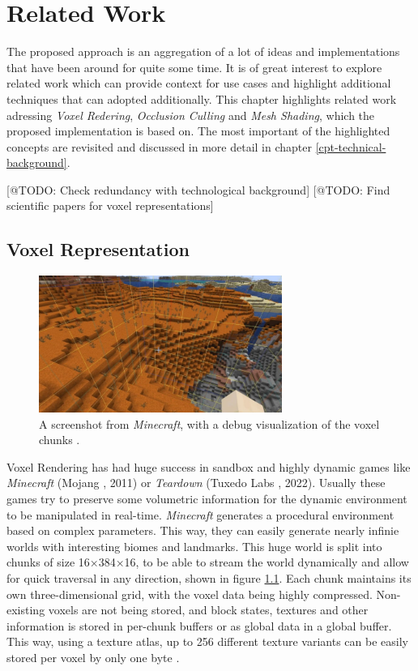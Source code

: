 \chapter{Related Work} \label{cpt-related-work}

The proposed approach is an aggregation of a lot of ideas and implementations that have been 
around for quite some time. It is of great interest to explore related work which can provide 
context for use cases and highlight additional techniques that can adopted additionally. This 
chapter highlights related work adressing \emph{Voxel Redering}, \emph{Occlusion Culling} 
and \emph{Mesh Shading}, which the proposed implementation is based on. The most important of 
the highlighted concepts are revisited and discussed in more detail in chapter 
\ref{cpt-technical-background}. 

[@TODO: Check redundancy with technological background]
[@TODO: Find scientific papers for voxel representations]

\section{Voxel Representation} \label{sec-voxel-representation}

\begin{figure}[h]
    \centering
    \includegraphics[width=300px]{images/graphics/minecraft-chunks.jpg}
    \caption{A screenshot from \emph{Minecraft}, with a debug visualization of the voxel chunks \cite{Palm2022}.}
    \label{fig:minecraft-chunks}
\end{figure}

\noindent
Voxel Rendering has had huge success in sandbox and highly dynamic games like \emph{Minecraft} (Mojang 
\cite{Mojang2024}, 2011) or \emph{Teardown} (Tuxedo Labs \cite{TuxedoLabs2022}, 2022). Usually these games try 
to preserve some volumetric information for the dynamic environment to be manipulated in real-time. \emph{Minecraft} 
generates a procedural environment based on complex parameters. This way, they can easily generate nearly infinie 
worlds with interesting biomes and landmarks. This huge world is split into chunks of size 16×384×16, to be able to 
stream the world dynamically and allow for quick traversal in any direction, shown in figure \ref{fig:minecraft-chunks}.
Each chunk maintains its own three-dimensional grid, with the voxel data being highly compressed. Non-existing voxels 
are not being stored, and block states, textures and other information is stored in per-chunk buffers or as global 
data in a global buffer. This way, using a texture atlas, up to 256 different texture variants can be easily stored 
per voxel by only one byte \cite{Bergensten2012, MinecraftFandom2021}. \\


